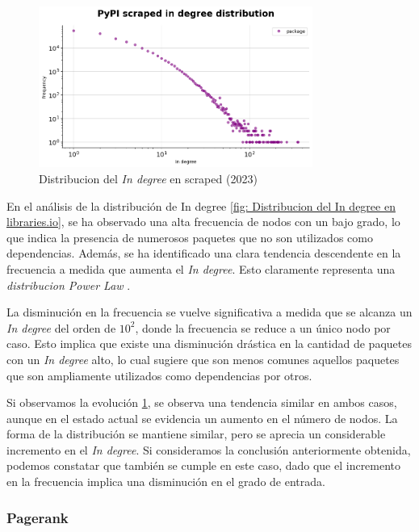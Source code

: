 \begin{figure}[h!]
    \begin{center}
        \includegraphics[width=0.8\textwidth]{img/pypi/ind_scraped_dist.png}
        \caption{Distribucion del \textit{In degree} en scraped (2023)}
        \label{fig: Distribucion del In degree en scraped}
    \end{center}
\end{figure}

En el análisis de la distribución de In degree \ref{fig: Distribucion del In degree en libraries.io},
se ha observado una alta frecuencia de nodos con un bajo grado,
lo que indica la presencia de numerosos paquetes que no son utilizados como dependencias. Además, se ha identificado
una clara tendencia descendente en la frecuencia a medida que aumenta el \textit{In degree}.
Esto claramente representa una \textit{distribucion Power Law} \cite{enwiki:1160892030}.

La disminución en la frecuencia se vuelve significativa a medida que se alcanza un \textit{In degree} del orden
de $10^2$, donde la frecuencia se reduce a un único nodo por caso. Esto implica que existe una disminución drástica
en la cantidad de paquetes con un \textit{In degree} alto, lo cual sugiere que son menos comunes aquellos paquetes
que son ampliamente utilizados como dependencias por otros.

Si observamos la evolución \ref{fig: Distribucion del In degree en scraped}, se observa una tendencia similar en ambos casos, aunque en el estado actual se evidencia
un aumento en el número de nodos. La forma de la distribución se mantiene similar, pero se aprecia un considerable
incremento en el \textit{In degree}. Si consideramos la conclusión anteriormente obtenida, podemos constatar que
también se cumple en este caso, dado que el incremento en la frecuencia implica una disminución en el grado de
entrada.

\subsubsection{Pagerank}


